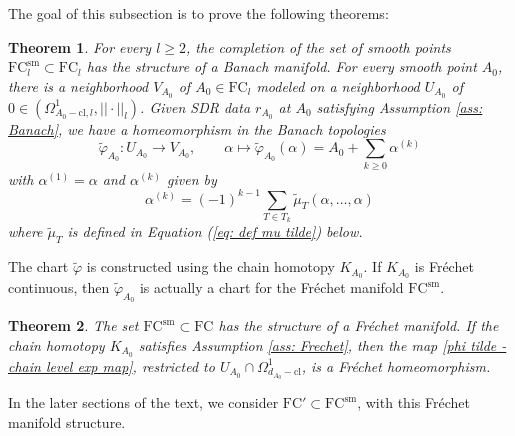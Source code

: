 \documentclass[11pt,a4paper]{amsart}
\theoremstyle{plain} %
\newtheorem{thm}{Theorem}[section]
\theoremstyle{definition}
\theoremstyle{remark}
\newcommand{\mr}{\mathrm}
\newcommand{\til}{\widetilde}
\newcommand{\FC}{\mathrm{FC}}
\begin{document}
The goal of this subsection is to prove the following theorems:
\begin{thm}\label{thm: banach smoothness}
    For every $l \geq 2$, the completion of the set of smooth points $\FC^\mr{sm}_l \subset \FC_l$ has the structure of a Banach manifold. For every smooth point $A_0$, there is a neighborhood $V_{A_0}$ of $A_0 \in \FC_l$ modeled on a neighborhood $U_{A_0}$ of $0 \in (\Omega^1_{A_0-\mr{cl},l},||\cdot||_l)$. Given SDR data $r_{A_0}$ at $A_0$ satisfying Assumption \ref{ass: Banach}, we have a homeomorphism in the Banach topologies  
    \begin{equation} \label{phi tilde - chain level exp map}
        \til{\varphi}_{A_0} \colon U_{A_0} \to V_{A_0}, \qquad \alpha \mapsto \til{\varphi}_{A_0}(\alpha) = A_0 + \sum_{k\geq 0}\alpha^{(k)}
    \end{equation}
     with $\alpha^{(1)} = \alpha$ and $\alpha^{(k)}$ given by 
    \begin{equation}
    \alpha^{(k)} = (-1)^{k-1} \sum_{T \in T_k} \til{\mu}_{T}(\alpha,\ldots,\alpha)
    \end{equation}
    where $\til{\mu}_T$ is defined in Equation (\ref{eq: def mu tilde}) below. 
\end{thm}
The chart $\til{\varphi}$ is constructed using the chain homotopy $K_{A_0}$. If $K_{A_0}$ is Fr\'echet continuous, then $\til{\varphi}_{A_0}$ is actually a chart for the  Fr\'echet manifold $\FC^\mr{sm}$. 
\begin{thm}\label{thm: Frechet smoothness}
    The set $\FC^\mr{sm} \subset \FC$ has the structure of a Fr\'echet manifold. If the chain homotopy $K_{A_0}$ satisfies Assumption \ref{ass: Frechet}, then the map \eqref{phi tilde - chain level exp map}, restricted to $U_{A_0} \cap \Omega^1_{d_{A_0}-\mr{cl}}$, is a Fr\'echet homeomorphism.
\end{thm}
In the later sections of the text, we consider $\FC' \subset \FC^\mr{sm}$, with this Fr\'echet manifold structure. 
\end{document}
